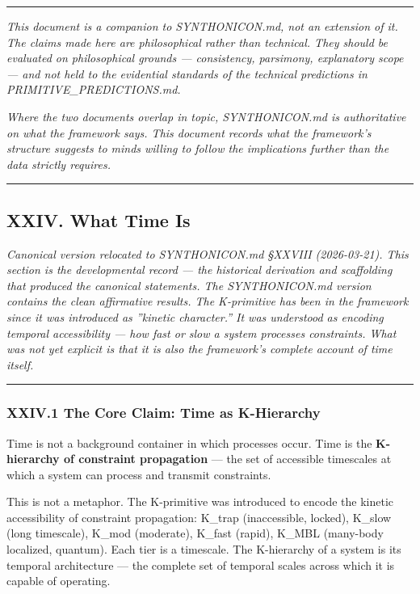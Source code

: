 \documentclass[12pt,a4paper]{article}
\begin{document}
\begin{center}
\rule{0.5\textwidth}{0.4pt}
\end{center}

\emph{This document is a companion to SYNTHONICON.md, not an extension of it. The claims made here are philosophical rather than technical. They should be evaluated on philosophical grounds --- consistency, parsimony, explanatory scope --- and not held to the evidential standards of the technical predictions in PRIMITIVE\_PREDICTIONS.md.}

\emph{Where the two documents overlap in topic, SYNTHONICON.md is authoritative on what the framework says. This document records what the framework's structure suggests to minds willing to follow the implications further than the data strictly requires.}

\begin{center}
\rule{0.5\textwidth}{0.4pt}
\end{center}

\subsection{XXIV. What Time Is}

\emph{Canonical version relocated to SYNTHONICON.md §XXVIII (2026-03-21). This section is the developmental record --- the historical derivation and scaffolding that produced the canonical statements. The SYNTHONICON.md version contains the clean affirmative results. The K-primitive has been in the framework since it was introduced as ''kinetic character.'' It was understood as encoding temporal accessibility --- how fast or slow a system processes constraints. What was not yet explicit is that it is also the framework's complete account of time itself.}

\begin{center}
\rule{0.5\textwidth}{0.4pt}
\end{center}

\subsubsection{XXIV.1 The Core Claim: Time as K-Hierarchy}

Time is not a background container in which processes occur. Time is the \textbf{K-hierarchy of constraint propagation} --- the set of accessible timescales at which a system can process and transmit constraints.

This is not a metaphor. The K-primitive was introduced to encode the kinetic accessibility of constraint propagation: K\_trap (inaccessible, locked), K\_slow (long timescale), K\_mod (moderate), K\_fast (rapid), K\_MBL (many-body localized, quantum). Each tier is a timescale. The K-hierarchy of a system is its temporal architecture --- the complete set of temporal scales across which it is capable of operating.
\end{document}
